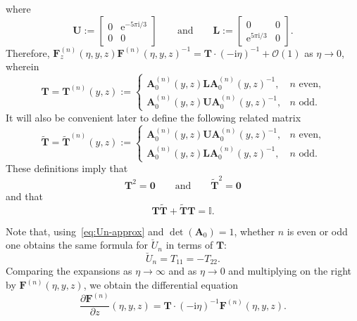  \pagebreak

\noindent
 where
 \begin{equation*}
 \mathbf{U}:=\begin{bmatrix}0&\mathrm{e}^{-5\pi\mathrm{i}/3}\\0&0\end{bmatrix}\qquad\text{and}\qquad\mathbf{L}:=\begin{bmatrix}0&0\\\mathrm{e}^{5\pi\mathrm{i}/3} & 0\end{bmatrix}.
 \end{equation*}
 Therefore, $\mathbf{F}^{(n)}_z(\eta,y,z)\mathbf{F}^{(n)}(\eta,y,z)^{-1}=\mathbf{T}\cdot(-\mathrm{i}\eta)^{-1} + \mathcal{O}(1)$ as $\eta\to 0$, wherein
 \begin{equation}
 \mathbf{T}=\mathbf{T}^{(n)}(y,z):=\begin{cases}\mathbf{A}^{(n)}_0(y,z)\mathbf{L}\mathbf{A}_0^{(n)}(y,z)^{-1},&\text{$n$ even,}\\\mathbf{A}_0^{(n)}(y,z)\mathbf{U}\mathbf{A}_0^{(n)}(y,z)^{-1},&\text{$n$ odd}.\end{cases}
 \label{eq:Z-define}
 \end{equation}
 It will also be convenient later to define the following related matrix
\begin{equation}
\widetilde{\mathbf{T}}=\widetilde{\mathbf{T}}^{(n)}(y,z):=\begin{cases}\mathbf{A}_0^{(n)}(y,z)\mathbf{U}\mathbf{A}_0^{(n)}(y,z)^{-1},&\text{$n$ even,}\\\mathbf{A}_0^{(n)}(y,z)\mathbf{L}\mathbf{A}_0^{(n)}(y,z)^{-1},&\text{$n$ odd}.\end{cases}
 \label{eq:Ztilde-define}
 \end{equation}
 These definitions imply that
 \begin{equation}
\mathbf{T}^2=\mathbf{0}\qquad\text{and}\qquad\widetilde{\mathbf{T}}^2=\mathbf{0}
\label{eq:ZsNilpotent}
\end{equation}
and that
\begin{equation}
\mathbf{T}\widetilde{\mathbf{T}}+\widetilde{\mathbf{T}}\mathbf{T}=\mathbb{I}.
\label{eq:anticommutator}
\end{equation}

 Note that, using~\eqref{eq:Un-approx} and $\det(\mathbf{A}_0)=1$, whether $n$ is even or odd one obtains the same formula for $\breve{U}_n$ in terms of $\mathbf{T}$:
 \begin{equation}
 \breve{U}_n=T_{11}=-T_{22}.
 \label{eq:breveU-Z}
 \end{equation}
 Comparing the expansions as $\eta\to\infty$ and as $\eta\to 0$ and multiplying on the right by $\mathbf{F}^{(n)}(\eta,y,z)$, we obtain the differential equation
 \begin{equation}
 \frac{\partial\mathbf{F}^{(n)}}{\partial z}(\eta,y,z)=\mathbf{T}\cdot(-\mathrm{i}\eta)^{-1}\mathbf{F}^{(n)}(\eta,y,z).
 \label{eq:dFdz}
 \end{equation}

